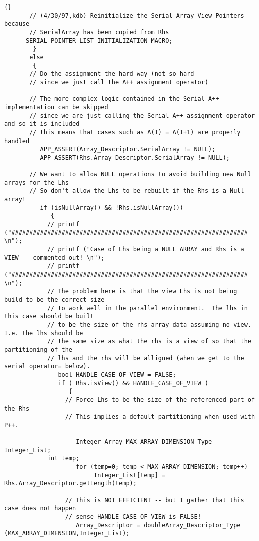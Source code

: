 \documentclass[10pt]{llncs}
\begin{document}
\begin{lstlisting}{}
       // (4/30/97,kdb) Reinitialize the Serial Array_View_Pointers because 
       // SerialArray has been copied from Rhs
	  SERIAL_POINTER_LIST_INITIALIZATION_MACRO;
        }
       else
        {
       // Do the assignment the hard way (not so hard 
       // since we just call the A++ assignment operator)

       // The more complex logic contained in the Serial_A++ implementation can be skipped
       // since we are just calling the Serial_A++ assignment operator and so it is included
       // this means that cases such as A(I) = A(I+1) are properly handled
          APP_ASSERT(Array_Descriptor.SerialArray != NULL);
          APP_ASSERT(Rhs.Array_Descriptor.SerialArray != NULL);

       // We want to allow NULL operations to avoid building new Null arrays for the Lhs
       // So don't allow the Lhs to be rebuilt if the Rhs is a Null array!
          if (isNullArray() && !Rhs.isNullArray())
             {
            // printf ("################################################################## \n");
            // printf ("Case of Lhs being a NULL ARRAY and Rhs is a VIEW -- commented out! \n");
            // printf ("################################################################## \n");
            // The problem here is that the view Lhs is not being build to be the correct size
            // to work well in the parallel environment.  The lhs in this case should be built
            // to be the size of the rhs array data assuming no view.  I.e. the lhs should be
            // the same size as what the rhs is a view of so that the partitioning of the 
            // lhs and the rhs will be alligned (when we get to the serial operator= below).
               bool HANDLE_CASE_OF_VIEW = FALSE;
               if ( Rhs.isView() && HANDLE_CASE_OF_VIEW )
                  {
                 // Force Lhs to be the size of the referenced part of the Rhs
                 // This implies a default partitioning when used with P++.

                    Integer_Array_MAX_ARRAY_DIMENSION_Type Integer_List;
		    int temp;
                    for (temp=0; temp < MAX_ARRAY_DIMENSION; temp++)
                         Integer_List[temp] = Rhs.Array_Descriptor.getLength(temp);

                 // This is NOT EFFICIENT -- but I gather that this case does not happen
                 // sense HANDLE_CASE_OF_VIEW is FALSE!
                    Array_Descriptor = doubleArray_Descriptor_Type (MAX_ARRAY_DIMENSION,Integer_List);


\end{lstlisting}
\end{document}
